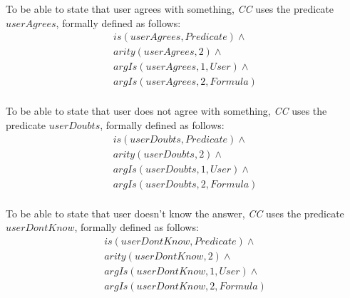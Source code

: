 \begin{definition}\label{def:userAgrees}
To be able to state that user agrees with something, \emph{CC} uses the 
predicate $userAgrees$, formally defined as follows:
\begin{equation}\label{as:userAgrees}
\begin{gathered}
	is(userAgrees, Predicate) \land \\
	arity(userAgrees,2) \land \\
	argIs(userAgrees,1,User) \land \\
	argIs(userAgrees,2,Formula)\\
\end{gathered}
\end{equation}
\end{definition}

\begin{definition}\label{def:userDoubts}
To be able to state that user does not agree with something, \emph{CC} uses 
the predicate $userDoubts$, formally defined as follows:
\begin{equation}\label{as:userDoubts}
\begin{gathered}
	is(userDoubts, Predicate) \land \\
	arity(userDoubts,2) \land \\
	argIs(userDoubts,1,User) \land \\
	argIs(userDoubts,2,Formula)\\
\end{gathered}
\end{equation}
\end{definition}

\begin{definition}\label{def:userDontKnow}
To be able to state that user doesn't know the answer, \emph{CC} uses the 
predicate $userDontKnow$, formally defined as follows:
\begin{equation}\label{as:userDontKnow}
\begin{gathered}
	is(userDontKnow, Predicate) \land \\
	arity(userDontKnow,2) \land \\
	argIs(userDontKnow,1,User) \land \\
	argIs(userDontKnow,2,Formula)\\
\end{gathered}
\end{equation}
\end{definition}

